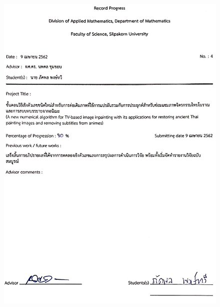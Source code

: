 \begin{figure}
    \includegraphics[width=\linewidth]{image/approval_letter/report_04.jpg}
\end{figure}
\clearpage
